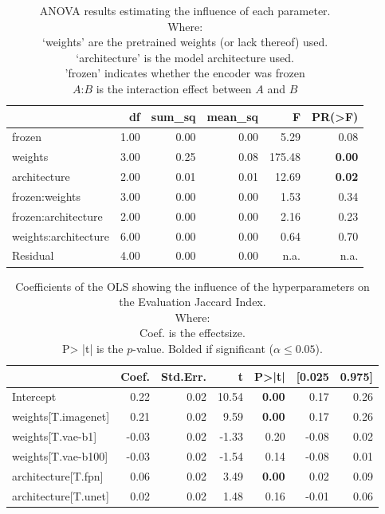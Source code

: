 \begin{table}[ht]
\centering
\caption{ANOVA results estimating the influence of each parameter.\\Where: \\\hphantom{tabb}`weights' are the pretrained weights (or lack thereof) used.\\\hphantom{tabb}`architecture' is the model architecture used.\\\hphantom{tabb}'frozen' indicates whether the encoder was frozen\\\hphantom{tabb}$A$:$B$ is the interaction effect between $A$ and $B$}
\label{tab:comparison_baselines_anova_all}
\begin{tabular}{lrrrrr}
\toprule
 & df & sum\_sq & mean\_sq & F & PR(>F) \\
\midrule
frozen & 1.00 & 0.00 & 0.00 & 5.29 & 0.08 \\
weights & 3.00 & 0.25 & 0.08 & 175.48 & \textbf{0.00} \\
architecture & 2.00 & 0.01 & 0.01 & 12.69 & \textbf{0.02} \\
frozen:weights & 3.00 & 0.00 & 0.00 & 1.53 & 0.34 \\
frozen:architecture & 2.00 & 0.00 & 0.00 & 2.16 & 0.23 \\
weights:architecture & 6.00 & 0.00 & 0.00 & 0.64 & 0.70 \\
Residual & 4.00 & 0.00 & 0.00 & n.a. & n.a. \\
\bottomrule
\end{tabular}
\end{table}


\begin{table}[ht]
\centering
\caption{Coefficients of the OLS showing the influence of the hyperparameters on the Evaluation Jaccard Index.\\Where:\\\hphantom{tabb}Coef. is the effectsize.\\\hphantom{tabb}P> |t| is the $p$-value. Bolded if significant ($\alpha\le0.05$).}
\label{tab:comparison_baselines_ols_effects}
\begin{tabular}{lrrrrrr}
\toprule
 & Coef. & Std.Err. & t & P>|t| & [0.025 & 0.975] \\
\midrule
Intercept & 0.22 & 0.02 & 10.54 & \textbf{0.00} & 0.17 & 0.26 \\
weights[T.imagenet] & 0.21 & 0.02 & 9.59 & \textbf{0.00} & 0.17 & 0.26 \\
weights[T.vae-b1] & -0.03 & 0.02 & -1.33 & 0.20 & -0.08 & 0.02 \\
weights[T.vae-b100] & -0.03 & 0.02 & -1.54 & 0.14 & -0.08 & 0.01 \\
architecture[T.fpn] & 0.06 & 0.02 & 3.49 & \textbf{0.00} & 0.02 & 0.09 \\
architecture[T.unet] & 0.02 & 0.02 & 1.48 & 0.16 & -0.01 & 0.06 \\
\bottomrule
\end{tabular}
\end{table}
